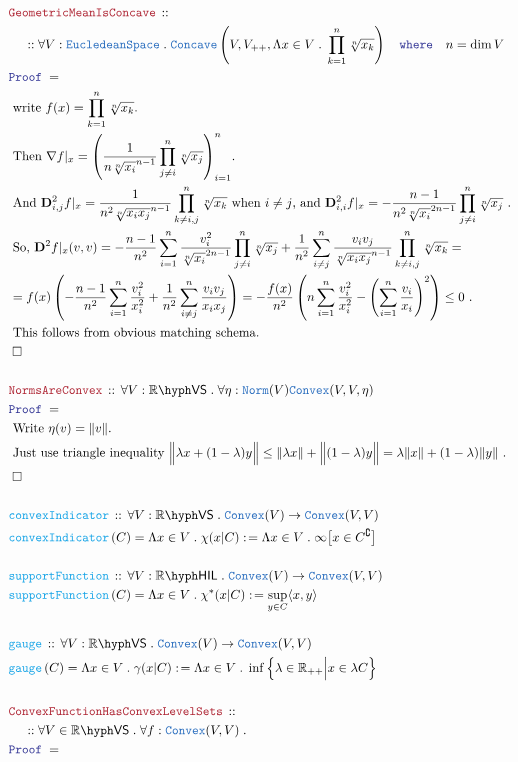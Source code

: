 \documentclass[12pt]{scrartcl}
\newcommand{\TYPE}[1]{\textcolor{NavyBlue}{\mathtt{#1}}}
\newcommand{\FUNC}[1]{\textcolor{Cerulean}{\mathtt{#1}}}
\newcommand{\LOGIC}[1]{\textcolor{Blue}{\mathtt{#1}}}
\newcommand{\THM}[1]{\textcolor{Maroon}{\mathtt{#1}}}
\renewcommand{\.}{\; . \;}
\newcommand{\de}{: \kern 0.1pc =}
\newcommand{\where}{\LOGIC{where}}
\newcommand{\Act}[1]{\left( #1 \right)}
\newcommand{\Theorem}[2]{& \THM{#1} \, :: \, #2 \\ & \Proof = \\ }
\newcommand{\DeclareFunc}[2]{& \FUNC{#1} \, :: \, #2 \\}
\newcommand{\DefineNamedFunc}[4]{&  \FUNC{#1}\Act{#2} = #3 \de #4 \\}
\newcommand{\NewLine}{\\ & \kern 1pc}
\newcommand{\Page}[1]{ \begin{align*} #1 \end{align*}   }
\newcommand{\Reals}{\mathbb{R} }
\renewcommand{\c}{\complement}
\newcommand{\QED}{\; \square}
\newcommand{\EndProof}{& \QED \\}
\newcommand{\Proof}{\LOGIC{Proof} \; }
\newcommand{\Explain}[1]{& \text{#1.} \\}
\newcommand{\ExplainFurther}[1]{& \text{#1} \\}
\newcommand{\VS}[1]{#1\hyph\mathsf{VS}} %
\newcommand{\Convex}{\TYPE{Convex}}
\newcommand{\Euc}{\TYPE{EucledeanSpace}}
\newcommand{\Concave}{\TYPE{Concave}}
\newcommand{\D}{\mathbf{D}}
\begin{document}
\Page{
	\Theorem{GeometricMeanIsConcave}
	{
		\NewLine ::		
		\forall V : \Euc \.
		\Concave\left( V, V_{++}, \Lambda x \in V \.  \prod^n_{k=1} \sqrt[n]{x_k}   \right)
		\quad \where \quad n = \dim V
	}
	\Explain{ write $f(x) = \prod^n_{k=1} \sqrt[n]{x_k}$}
	\Explain{
		Then $\nabla f|_x  = \left( \frac{1}{n\sqrt[n]{x_i}^{n-1}} \prod^n_{j\neq i} \sqrt[n]{x_j} \right)^n_{i=1} $}
	\Explain{
		And $\D^2_{i,j} f|_x = \frac{1}{n^2\sqrt[n]{x_i x_j}^{n-1}} \prod^n_{k \neq i,j} \sqrt[n]{x_k}$ 
		when $i \neq j$, and
		$\D^2_{i,i} f|_x =   -\frac{n-1}{n^2\sqrt[n]{x_i}^{2n-1}} \prod^n_{j\neq i} \sqrt[n]{x_j}$ }
	\ExplainFurther{
		So,
		$\D^2 f|_x(v,v) = -\frac{n-1}{n^2}\sum^n_{i=1}  
			\frac{v_i^2}{\sqrt[n]{x_i}^{2n-1}} \prod^n_{j\neq i} \sqrt[n]{x_j}  
			+   \frac{1}{n^2}\sum^n_{i\neq j} \frac{v_i v_j}{\sqrt[n]{x_i x_j}^{n-1}} \prod^n_{k \neq i,j} \sqrt[n]{x_k}	
			=$}
	\Explain{
		$
				=f(x)\left(  -\frac{n-1}{n^2} \sum^n_{i=1} \frac{v_i^2}{x_i^2} +        
				\frac{1}{n^2} \sum^n_{i\neq j} \frac{v_i v_j}{x_i x_j} \right) =
				-\frac{f(x)}{n^2}\left( n \sum^n_{i=1} \frac{v_i^2}{x_i^2} - 
				\left(\sum^n_{i=1} \frac{v_i}{x_i}\right)^2     \right) \le 0	
		$
		}
	\Explain{ This follows from obvious matching schema}
	\EndProof
	\\
	\Theorem{NormsAreConvex}
	{
		\forall V : \VS{\Reals} \.
		\forall \eta : \TYPE{Norm}(V)
		\Convex(V,V,\eta)
	}
	\Explain{
		Write $\eta(v) = \|v\|$}
	\Explain{ 
		Just use triangle inequality
		$\Big\| \lambda x + (1 - \lambda) y \Big\|  \le 
		\| \lambda x \| + \Big\| (1 - \lambda) y \Big\| = 
		\lambda \|x\| + (1 - \lambda) \|y\|$	}
	\EndProof
	\\
	\DeclareFunc{convexIndicator}
	{
		\forall V : \VS{\Reals} \.
		\Convex(V) \to \Convex(V,V)
	}
	\DefineNamedFunc{convexIndicator}{C}{\Lambda x \in V \. \chi(x|C)}{
			\Lambda x \in V \.  \infty\big[x \in C^\c\big]
	}
	\\
	\DeclareFunc{supportFunction}
	{
		\forall V : \Reals\hyph\mathsf{HIL} \.
		\Convex(V) \to \Convex(V,V)
	}
	\DefineNamedFunc{supportFunction}{C}{\Lambda x \in V \. \chi^*(x|C)}{
			\sup_{y \in C} \langle x,y \rangle
	}
	\\
	\DeclareFunc{gauge}
	{
		\forall V : \VS{\Reals} \.
		\Convex(V) \to \Convex(V,V)
	}
	\DefineNamedFunc{gauge}{C}{\Lambda x \in V \. \gamma(x|C)}{
			\Lambda x \in V \. \inf \Big\{ \lambda \in  \Reals_{++} \Big| x \in \lambda C \Big\}
	}
	\\
	\Theorem{ConvexFunctionHasConvexLevelSets}
	{
		\NewLine ::		
		\forall V \in \VS{\Reals} \.
		\forall f : \Convex(V,V) \.
}}
\end{document}
